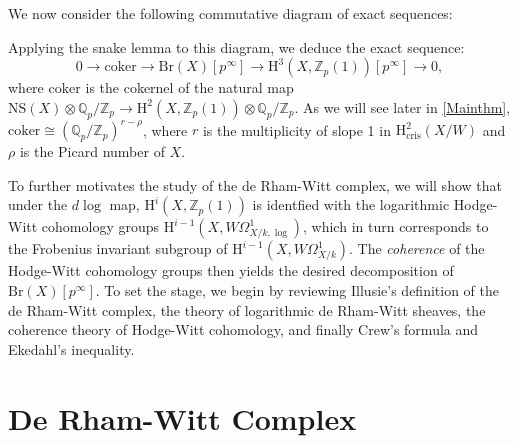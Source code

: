 \documentclass[a4paper,12pt,twoside]{report}
\newcommand{\Q}{\mathbb{Q}}
\newcommand{\Z}{\mathbb{Z}}
\newcommand{\cris}{\mathrm{cris}}
\newcommand{\fppf}{\mathrm{fppf}}
\newcommand{\Br}{\mathrm{Br}}
\newcommand{\NS}{\mathrm{NS}}
\newcommand{\HH}{\mathrm{H}}
\begin{document}
We now consider the following commutative diagram of exact sequences:
\begin{small}
\begin{center}
\end{center}
\end{small}Applying the snake lemma to this diagram, we deduce the exact sequence:
\[0\rightarrow \mathrm{coker} \rightarrow \Br(X)[p^\infty]\rightarrow \HH^3(X,\Z_p(1))[p^\infty] \rightarrow 0,\]
where $\mathrm{coker}$ is the cokernel of the natural map $\NS(X)\otimes \Q_p/\Z_p\rightarrow\HH^2(X,\Z_p(1))\otimes \Q_p/\Z_p$.
As we will see later in \ref{Mainthm}, $\mathrm{coker}\cong (\Q_p/\Z_p)^{r-\rho}$, where $r$ is the multiplicity of slope 1 in $\HH^2_{\cris}(X/W)$ 
and $\rho$ is the Picard number of $X$. 

To further motivates the study of the de Rham-Witt complex, 
we will show that under the $d\log$ map, $\HH^i(X,\Z_p(1))$ is identfied with the logarithmic Hodge-Witt cohomology groups 
$\HH^{i-1}(X,W\Omega_{X/k,\log}^1)$, which in turn corresponds to the Frobenius invariant subgroup 
of $\HH^{i-1}(X,W\Omega^1_{X/k})$. 
The \emph{coherence} of the Hodge-Witt cohomology groups then yields the desired decomposition of $\Br(X)[p^\infty]$. 
To set the stage, we begin by reviewing Illusie's definition of the de Rham-Witt complex, the theory of logarithmic de Rham-Witt sheaves, 
the coherence theory of Hodge-Witt cohomology, and finally Crew's formula and Ekedahl's inequality.

\section{De Rham-Witt Complex}
\end{document}
